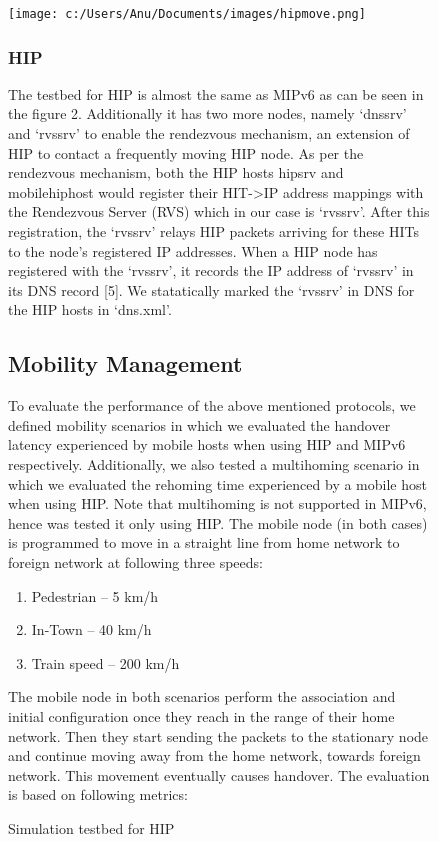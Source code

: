 \documentclass{llncs}
\begin{document}
\begin{figure} [1]
\caption{Simulation testbed for HIP}
\texttt{[image: c:/Users/Anu/Documents/images/hipmove.png]}

\subsubsection{HIP}
The testbed for HIP is almost the same as MIPv6 as can be seen in the figure 2. Additionally it has two more nodes, namely ‘dnssrv’ and ‘rvssrv’ to enable the rendezvous mechanism, an extension of HIP to contact a frequently moving HIP node.  As per the rendezvous mechanism, both the HIP hosts hipsrv and mobilehiphost would register their HIT->IP address mappings with the Rendezvous Server (RVS) which in our case is ‘rvssrv’.  After this registration, the ‘rvssrv’ relays HIP packets arriving for these HITs to the node's registered IP addresses.  When a HIP node has registered with the ‘rvssrv’, it records the IP address of ‘rvssrv’ in its DNS record [5]. We statatically marked the ‘rvssrv’ in DNS for the HIP hosts in ‘dns.xml'.

\subsection{Mobility Management}
To evaluate the performance of the above mentioned protocols, we defined mobility scenarios in which we evaluated the handover latency experienced by mobile hosts when using HIP and MIPv6 respectively. Additionally, we also tested a multihoming scenario in which we evaluated the rehoming time experienced by a mobile host when using HIP. Note that multihoming is not supported in MIPv6, hence was tested it only using HIP.
The mobile node (in both cases) is programmed to move in a straight line from home network to foreign network at following three speeds:
\begin{enumerate}
\item Pedestrian – 5 km/h
\item In-Town – 40 km/h
\item Train speed – 200 km/h
\end{enumerate}

The mobile node in both scenarios perform the association and initial configuration once they reach in the range of their home network. Then they start sending the packets to the stationary node and continue moving away from the home network, towards foreign network. This movement eventually causes handover. The evaluation is based on following metrics: 


\end{figure}
\end{document}
